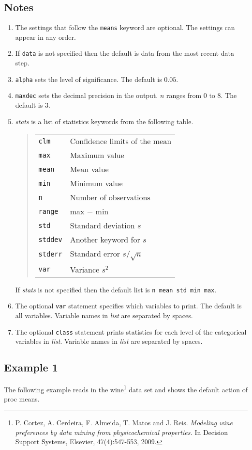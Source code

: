 \documentclass[11pt]{article}
\begin{document}
\subsection*{Notes}
\begin{enumerate}
\item
The settings that follow the {\tt means} keyword are optional.
The settings can appear in any order.
\item
If {\tt data} is not specified then the default is data from
the most recent data step.
\item
{\tt alpha} sets the level of significance.
The default is $0.05$.
\item
{\tt maxdec} sets the decimal precision in the output.
$n$ ranges from 0 to 8.
The default is 3.
\item
{\it stats} is a list of statistics keywords
from the following table.
\begin{quote}
\begin{tabular}{ll}
{\tt clm} & Confidence limits of the mean\\
{\tt max} & Maximum value\\
{\tt mean} & Mean value\\
{\tt min} & Minimum value\\
{\tt n} & Number of observations\\
{\tt range} & max $-$ min\\
{\tt std} & Standard deviation $s$\\
{\tt stddev} & Another keyword for $s$\\
{\tt stderr} & Standard error $s/\sqrt n$\\
{\tt var} & Variance $s^2$
\end{tabular}
\end{quote}
If {\it stats} is not specified then the default list is
{\tt n mean std min max}.
\item
The optional {\tt var} statement specifies which variables to print.
The default is all variables.
Variable names in {\it list} are separated by spaces.
\item
The optional {\tt class} statement prints statistics for each level
of the categorical variables in {\it list}.
Variable names in {\it list} are separated by spaces.
\end{enumerate}

\subsection*{Example 1}
The following example reads in the wine\footnote{
P. Cortez, A. Cerdeira, F. Almeida, T. Matos and J. Reis.
{\it Modeling wine preferences by data mining from physicochemical properties.}
In Decision Support Systems, Elsevier, 47(4):547-553, 2009.}
data set and shows the default action of proc means.
\end{document}

